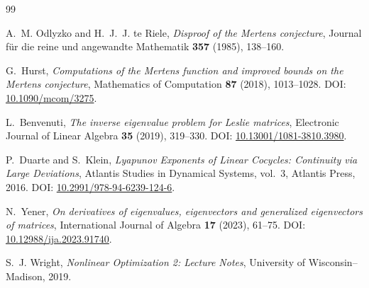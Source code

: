 \documentclass[11pt]{amsart}
\numberwithin{equation}{section}
\theoremstyle{plain}
\theoremstyle{definition}
\theoremstyle{remark}
\begin{document}
\begin{thebibliography}{99}

A.~M. Odlyzko and H.~J.~J. te Riele,
\emph{Disproof of the Mertens conjecture},
Journal f\"ur die reine und angewandte Mathematik \textbf{357} (1985), 138--160.

G.~Hurst,
\emph{Computations of the Mertens function and improved bounds on the Mertens conjecture},
Mathematics of Computation \textbf{87} (2018), 1013--1028.
DOI: \href{https://doi.org/10.1090/mcom/3275}{10.1090/mcom/3275}.

L.~Benvenuti,
\emph{The inverse eigenvalue problem for Leslie matrices},
Electronic Journal of Linear Algebra \textbf{35} (2019), 319--330.
DOI: \href{https://doi.org/10.13001/1081-3810.3980}{10.13001/1081-3810.3980}.

P.~Duarte and S.~Klein,
\emph{Lyapunov Exponents of Linear Cocycles: Continuity via Large Deviations},
Atlantis Studies in Dynamical Systems, vol.~3, Atlantis Press, 2016.
DOI: \href{https://doi.org/10.2991/978-94-6239-124-6}{10.2991/978-94-6239-124-6}.

N.~Yener,
\emph{On derivatives of eigenvalues, eigenvectors and generalized eigenvectors of matrices},
International Journal of Algebra \textbf{17} (2023), 61--75.
DOI: \href{https://doi.org/10.12988/ija.2023.91740}{10.12988/ija.2023.91740}.

S.~J. Wright,
\emph{Nonlinear Optimization 2: Lecture Notes},
University of Wisconsin--Madison, 2019.

\end{thebibliography}
\end{document}
